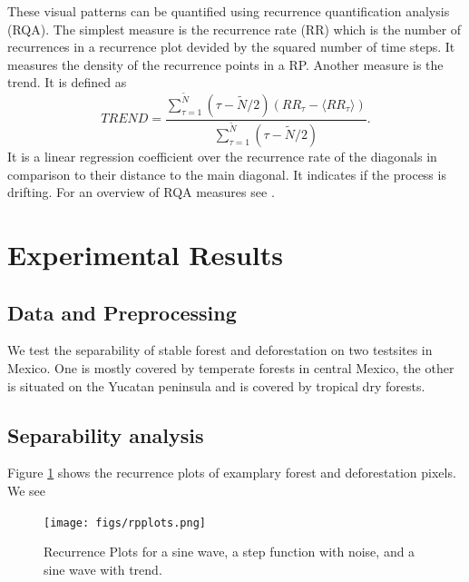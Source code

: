 \documentclass{article}
\begin{document}
These visual patterns can be quantified using recurrence quantification analysis (RQA)\cite{Zbilut}.
The simplest measure is the recurrence rate (RR) which is the number of recurrences in a recurrence plot devided by the squared number of time steps.
It measures the density of the recurrence points in a RP.
Another measure is the trend.
It is defined as
$$ TREND= \frac{\sum_{\tau=1}^{\tilde{N}}(\tau - \tilde{N}/2)(RR_\tau - \langle RR_\tau \rangle)}{\sum_{\tau=1}^{\tilde{N}}(\tau - \tilde{N}/2)}.$$
It is a linear regression coefficient over the recurrence rate of the diagonals in comparison to their distance to the main diagonal.
It indicates if the process is drifting.
For an overview of RQA measures see \cite{Marwan06}.


\section{Experimental Results}
\subsection{Data and Preprocessing}
We test the separability of stable forest and deforestation on two testsites in Mexico.
One is mostly covered by temperate forests in central Mexico,
the other is situated on the Yucatan peninsula and is covered by tropical dry forests.




\subsection{Separability analysis}

Figure \ref{rpforest} shows the recurrence plots of examplary forest and deforestation pixels.
We see
\begin{figure}
  \texttt{[image: figs/rpplots.png]}
  \caption{Recurrence Plots for a sine wave, a step function with noise, and a sine wave with trend.}
  \label{rpforest}
\end{figure}
\end{document}
